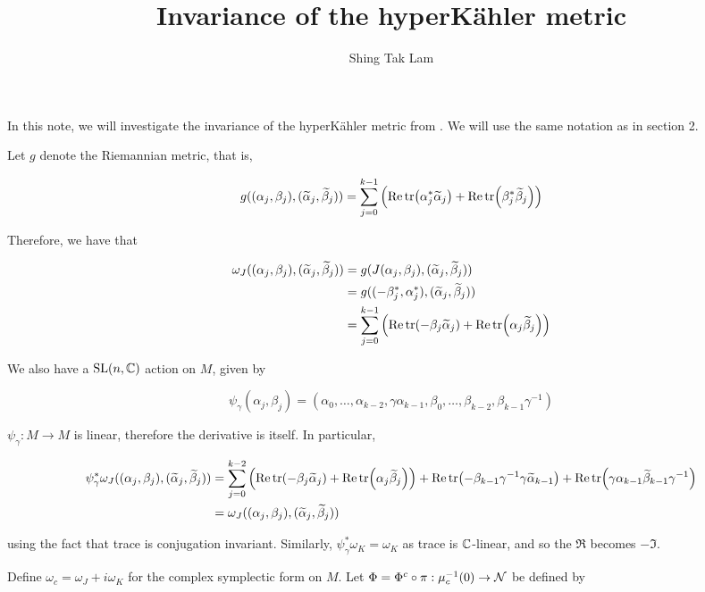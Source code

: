 \documentclass{article}
\title{Invariance of the hyperK\"ahler metric}
\author{Shing Tak Lam}
\renewcommand{\tilde}{\widetilde}
\begin{document}
\maketitle

In this note, we will investigate the invariance of the hyperK\"ahler metric from \cite{kobak_classical_1996}. We will use the same notation as in section 2.

Let \(g\) denote the Riemannian metric, that is,

\[g((\alpha_j, \beta_j), (\tilde\alpha_j, \tilde\beta_j)) = \sum_{j=0}^{k-1}\left(\Re\tr(\alpha_j^*\tilde\alpha_j) + \Re\tr(\beta_j^*\tilde\beta_j)\right)\]

Therefore, we have that

\begin{align*}
    \omega_J((\alpha_j, \beta_j), (\tilde\alpha_j, \tilde\beta_j)) &= g(J(\alpha_j, \beta_j), (\tilde\alpha_j, \tilde\beta_j))\\
    &= g((-\beta_j^*, \alpha_j^*), (\tilde\alpha_j, \tilde\beta_j)) \\
    &= \sum_{j=0}^{k-1}\left(\Re\tr(-\beta_j\tilde\alpha_j) + \Re\tr(\alpha_j\tilde\beta_j)\right)
\end{align*}

We also have a \(\operatorname{SL}(n, \mathbb{C})\) action on \(M\), given by

\[\psi_\gamma (\alpha_j, \beta_j) = (\alpha_0, \dots, \alpha_{k-2}, \gamma\alpha_{k-1}, \beta_0, \dots, \beta_{k-2}, \beta_{k-1}\gamma^{-1})\]

\(\psi_\gamma : M \to M\) is linear, therefore the derivative is itself. In particular,

\begin{align*}
    \psi_\gamma^*\omega_J((\alpha_j, \beta_j), (\tilde\alpha_j, \tilde\beta_j)) &= \sum_{j=0}^{k-2}\left(\Re\tr(-\beta_j\tilde\alpha_j) + \Re\tr(\alpha_j\tilde\beta_j)\right) + \Re\tr(-\beta_{k-1}\gamma^{-1}\gamma\tilde\alpha_{k-1}) + \Re\tr(\gamma\alpha_{k-1}\tilde\beta_{k-1}\gamma^{-1}) \\
    &= \omega_J((\alpha_j, \beta_j), (\tilde\alpha_j, \tilde\beta_j))
\end{align*}

using the fact that trace is conjugation invariant. Similarly, \(\psi_\gamma^*\omega_K = \omega_K\) as trace is \(\mathbb{C}\)-linear, and so the \(\Re\) becomes \(-\Im\).

Define \(\omega_c = \omega_J + i\omega_K\) for the complex symplectic form on \(M\). Let \(\Phi = \Phi^c \circ \pi : \mu_c^{-1}(0) \to \mathcal{N}\) be defined by
\end{document}
